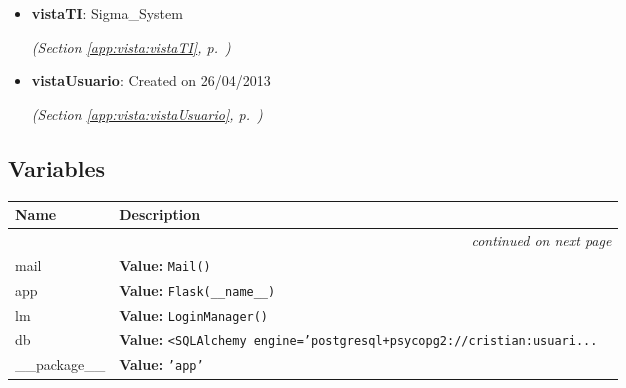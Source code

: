 \begin{itemize}
\begin{itemize}
    \item \textbf{vistaTI}: Sigma\_System



  \textit{(Section \ref{app:vista:vistaTI}, p.~\pageref{app:vista:vistaTI})}

    \item \textbf{vistaUsuario}: Created on 26/04/2013



  \textit{(Section \ref{app:vista:vistaUsuario}, p.~\pageref{app:vista:vistaUsuario})}

  \end{itemize}
\end{itemize}



  \subsection{Variables}

    \vspace{-1cm}
\hspace{\varindent}\begin{longtable}{|p{\varnamewidth}|p{\vardescrwidth}|l}
\cline{1-2}
\cline{1-2} \centering \textbf{Name} & \centering \textbf{Description}& \\
\cline{1-2}
\endhead\cline{1-2}\multicolumn{3}{r}{\small\textit{continued on next page}}\\\endfoot\cline{1-2}
\endlastfoot\raggedright m\-a\-i\-l\- & \raggedright \textbf{Value:} 
{\tt Mail()}&\\
\cline{1-2}
\raggedright a\-p\-p\- & \raggedright \textbf{Value:} 
{\tt Flask(\_\_name\_\_)}&\\
\cline{1-2}
\raggedright l\-m\- & \raggedright \textbf{Value:} 
{\tt LoginManager()}&\\
\cline{1-2}
\raggedright d\-b\- & \raggedright \textbf{Value:} 
{\tt {\textless}SQLAlchemy engine='postgresql+psycopg2://cristian:usuari\texttt{...}}&\\
\cline{1-2}
\raggedright \_\-\_\-p\-a\-c\-k\-a\-g\-e\-\_\-\_\- & \raggedright \textbf{Value:} 
{\tt \texttt{'}\texttt{app}\texttt{'}}&\\
\cline{1-2}
\end{longtable}

